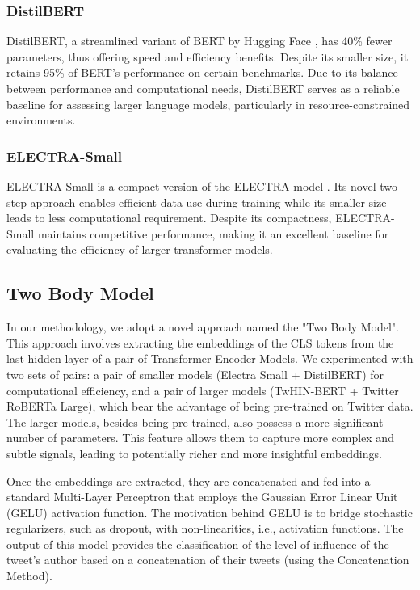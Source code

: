 \documentclass[]{ceurart}
\begin{document}
\subsubsection*{DistilBERT}
DistilBERT, a streamlined variant of BERT by Hugging Face \cite{sanh2020distilbert}, has 40\% fewer parameters, thus offering speed and efficiency benefits. Despite its smaller size, it retains 95\% of BERT's performance on certain benchmarks. Due to its balance between performance and computational needs, DistilBERT serves as a reliable baseline for assessing larger language models, particularly in resource-constrained environments.

\subsubsection*{ELECTRA-Small}
ELECTRA-Small is a compact version of the ELECTRA model \cite{clark2020electra}. Its novel two-step approach enables efficient data use during training while its smaller size leads to less computational requirement. Despite its compactness, ELECTRA-Small maintains competitive performance, making it an excellent baseline for evaluating the efficiency of larger transformer models.

\subsection{Two Body Model}
In our methodology, we adopt a novel approach named the "Two Body Model". This approach involves extracting the embeddings of the CLS tokens from the last hidden layer of a pair of Transformer Encoder Models. We experimented with two sets of pairs: a pair of smaller models (Electra Small + DistilBERT) for computational efficiency, and a pair of larger models (TwHIN-BERT + Twitter RoBERTa Large), which bear the advantage of being pre-trained on Twitter data. The larger models, besides being pre-trained, also possess a more significant number of parameters. This feature allows them to capture more complex and subtle signals, leading to potentially richer and more insightful embeddings.

Once the embeddings are extracted, they are concatenated and fed into a standard Multi-Layer Perceptron that employs the Gaussian Error Linear Unit (GELU) \cite{Hendrycks2016GaussianEL} activation function. The motivation behind GELU is to bridge stochastic regularizers, such as dropout, with non-linearities, i.e., activation functions. The output of this model provides the classification of the level of influence of the tweet's author based on a concatenation of their tweets (using the Concatenation Method).
\end{document}
